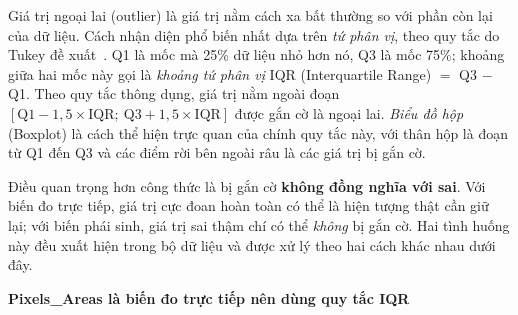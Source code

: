 \documentclass[12pt]{article}
\begin{document}
Giá trị ngoại lai (outlier) là giá trị nằm cách xa bất thường so với phần còn lại của dữ liệu. Cách nhận diện phổ biến nhất dựa trên \emph{tứ phân vị}, theo quy tắc do Tukey đề xuất~\cite{tukey1977}. Q1 là mốc mà 25\% dữ liệu nhỏ hơn nó, Q3 là mốc 75\%; khoảng giữa hai mốc này gọi là \emph{khoảng tứ phân vị} IQR (Interquartile Range) $=$ Q3 $-$ Q1. Theo quy tắc thông dụng, giá trị nằm ngoài đoạn $[\mathrm{Q1} - 1{,}5 \times \mathrm{IQR};\ \mathrm{Q3} + 1{,}5 \times \mathrm{IQR}]$ được gắn cờ là ngoại lai. \emph{Biểu đồ hộp} (Boxplot) là cách thể hiện trực quan của chính quy tắc này, với thân hộp là đoạn từ Q1 đến Q3 và các điểm rời bên ngoài râu là các giá trị bị gắn cờ.

\noindent
Điều quan trọng hơn công thức là bị gắn cờ \textbf{không đồng nghĩa với sai}. Với biến đo trực tiếp, giá trị cực đoan hoàn toàn có thể là hiện tượng thật cần giữ lại; với biến phái sinh, giá trị sai thậm chí có thể \emph{không} bị gắn cờ. Hai tình huống này đều xuất hiện trong bộ dữ liệu và được xử lý theo hai cách khác nhau dưới đây.

\noindent
\textbf{Pixels\_Areas là biến đo trực tiếp nên dùng quy tắc IQR}
\end{document}
